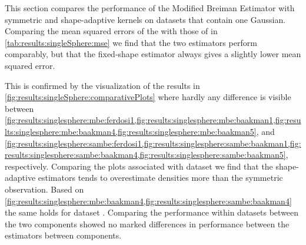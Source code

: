 
\begin{figure*}
	\centering
	
	\caption{Plot of the density as estimated by - \mbe and - \sambe as a function of the known density of the datasets with a single Gaussian.}
	\label{fig:results:singleSphere:comparativePlots}
\end{figure*}

\begin{table}
	\centering
	
	\caption{Performance of the Modified Breiman Estimator with fixed-shaped and shape-adaptive kernels on the datasets with a single Gaussian.} 	
	\label{tab:results:singleSphere:mse}
\end{table}

\begin{table}
	\centering
	
	\caption{The mean and the standard deviation of the anisotropy of the kernels used for the datasets with a single Gaussian.}
	\label{tab:results:singleSphere:anisotropy}
\end{table}

This section compares the performance of the Modified Breiman Estimator with symmetric and shape-adaptive kernels on datasets that contain one Gaussian. 
	Comparing the mean squared errors of the \mbe with those of \sambe in \cref{tab:results:singleSphere:mse} we find that the two estimators perform comparably, but that the fixed-shape estimator always gives a slightly lower mean squared error. 

	This is confirmed by the visualization of the results in \cref{fig:results:singleSphere:comparativePlots} where hardly any difference is visible between \cref{fig:results:singlesphere:mbe:ferdosi1,fig:results:singlesphere:mbe:baakman1,fig:results:singlesphere:mbe:baakman4,fig:results:singlesphere:mbe:baakman5}, and \cref{fig:results:singlesphere:sambe:ferdosi1,fig:results:singlesphere:sambe:baakman1,fig:results:singlesphere:sambe:baakman4,fig:results:singlesphere:sambe:baakman5}, respectively. 
		Comparing the plots associated with dataset \ferdosiOne we find that the shape-adaptive estimators tends to overestimate densities more than the symmetric observation. 
		Based on \cref{fig:results:singlesphere:mbe:baakman4,fig:results:singlesphere:sambe:baakman4} the same holds for dataset \baakmanFour. 
	Comparing the performance within datasets between the two components showed no marked differences in performance between the estimators between components.

